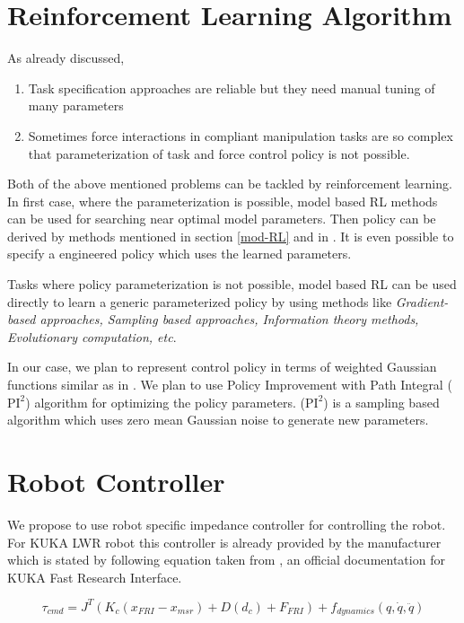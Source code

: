 \documentclass[thesis]{mas_proposal}
\begin{document}
\section{Reinforcement Learning Algorithm}

As already discussed, \begin{enumerate}
	\item Task specification approaches are reliable but they need manual tuning of many parameters
	\item Sometimes force interactions in compliant manipulation tasks are so complex that parameterization of task and force control policy is not possible. 
\end{enumerate}
Both of the above mentioned problems can be tackled by reinforcement learning. In first case, where the parameterization is possible, model based RL methods can be used for searching near optimal model parameters. Then policy can be derived by methods mentioned in section \ref{mod-RL} and in \cite{polydoros2017survey}. It is even possible to specify a engineered policy which uses the learned parameters.

Tasks where policy parameterization is not possible, model based RL can be used directly to learn a generic parameterized policy by using methods like \textit{Gradient-based approaches, Sampling based approaches, Information theory methods, Evolutionary computation, etc}\cite{polydoros2017survey}. 

In our case, we plan to represent control policy in terms of weighted Gaussian functions similar as in \cite{nemec2017door}. We plan to use Policy Improvement with Path Integral ($\text{PI}^{2}$) algorithm\cite{theodorou2010learning} for optimizing the policy parameters. ($\text{PI}^{2}$) is a sampling based algorithm which uses zero mean Gaussian noise to generate new parameters.    

\section{Robot Controller}

We propose to use robot specific impedance controller for controlling the robot. For KUKA LWR robot this controller is already provided by the manufacturer which is stated by following equation taken from \cite{schreiber2010fast}, an official documentation for KUKA Fast Research Interface.

\begin{equation}
\tau_{cmd} = J^{T}(K_{c}(x_{FRI} - x_{msr}) + D(d_{c}) + F_{FRI}) + f_{dynamics}(q, \dot{q}, \ddot{q})
\end{equation}
\end{document}
